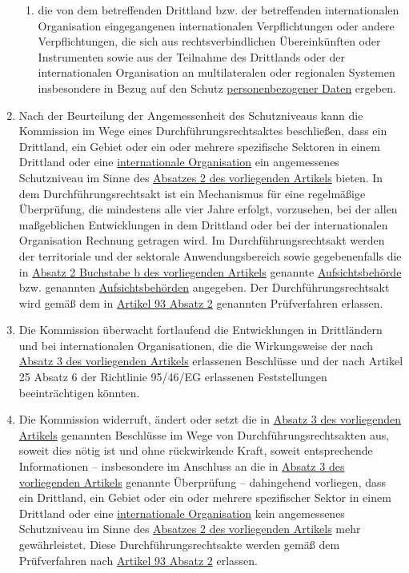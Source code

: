 \begin{enumerate}
\begin{enumerate}
    \item die von dem betreffenden Drittland bzw. der betreffenden internationalen Organisation eingegangenen
     internationalen Verpflichtungen oder andere Verpflichtungen, die sich aus rechtsverbindlichen Übereinkünften oder
     Instrumenten sowie aus der Teilnahme des Drittlands oder der internationalen Organisation an multilateralen oder
     regionalen Systemen insbesondere in Bezug auf den Schutz \hyperref[itm:04-1]{personenbezogener Daten} ergeben.%
    \label{itm:45-2c}

  \end{enumerate}

  \item Nach der Beurteilung der Angemessenheit des Schutzniveaus kann die Kommission im Wege eines
   Durchführungsrechtsaktes beschließen, dass ein Drittland, ein Gebiet oder ein oder mehrere spezifische Sektoren in
   einem Drittland oder eine \hyperref[itm:04-26]{internationale Organisation} ein angemessenes Schutzniveau im Sinne
   des \hyperref[itm:45-2]{Absatzes 2 des vorliegenden Artikels} bieten. In dem Durchführungsrechtsakt ist ein
   Mechanismus für eine regelmäßige Überprüfung, die mindestens alle vier Jahre erfolgt, vorzusehen, bei der allen
   maßgeblichen Entwicklungen in dem Drittland oder bei der internationalen Organisation Rechnung getragen wird. Im
   Durchführungsrechtsakt werden der territoriale und der sektorale Anwendungsbereich sowie gegebenenfalls die in
   \hyperref[itm:45-2b]{Absatz 2 Buchstabe b des vorliegenden Artikels} genannte \hyperref[itm:04-21]
    {Aufsichtsbehörde} bzw. genannten
   \hyperref[itm:04-21]{Aufsichtsbehörden} angegeben. Der Durchführungsrechtsakt wird gemäß dem in \hyperref[itm:93-2]
    {Artikel 93 Absatz 2} genannten Prüfverfahren erlassen.%
  \label{itm:45-3}

  \item Die Kommission überwacht fortlaufend die Entwicklungen in Drittländern und bei internationalen Organisationen,
   die die Wirkungsweise der nach \hyperref[itm:45-3]{Absatz 3 des vorliegenden Artikels} erlassenen Beschlüsse und der
   nach Artikel 25 Absatz 6 der Richtlinie 95/46/EG erlassenen Feststellungen beeinträchtigen
   könnten.%
  \label{itm:45-4}

  \item Die Kommission widerruft, ändert oder setzt die in \hyperref[itm:45-3]{Absatz 3 des vorliegenden Artikels}
   genannten Beschlüsse im Wege von Durchführungsrechtsakten aus, soweit dies nötig ist und ohne rückwirkende Kraft,
   soweit entsprechende Informationen -- insbesondere im Anschluss an die in \hyperref[itm:45-3]{Absatz 3 des
   vorliegenden Artikels} genannte Überprüfung -- dahingehend vorliegen, dass ein Drittland, ein Gebiet oder ein oder
   mehrere spezifischer Sektor in einem Drittland oder eine \hyperref[itm:04-26]{internationale Organisation} kein
   angemessenes Schutzniveau im Sinne des \hyperref[itm:45-2]{Absatzes 2 des vorliegenden Artikels} mehr gewährleistet.
   Diese Durchführungsrechtsakte werden gemäß dem Prüfverfahren nach \hyperref[itm:93-2]{Artikel 93 Absatz 2}
   erlassen. %
  \label{itm:45-5}


\end{enumerate}

